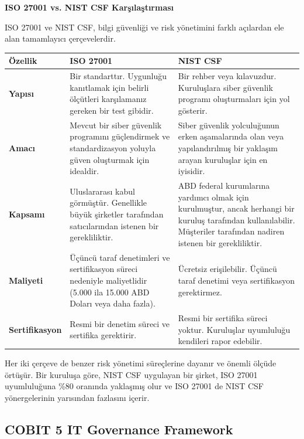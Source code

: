 \textbf{ISO 27001 vs. NIST CSF Karşılaştırması}

ISO 27001 ve NIST CSF, bilgi güvenliği ve risk yönetimini farklı açılardan ele alan tamamlayıcı çerçevelerdir.

\begin{center}
\begin{tabular}{|p{4cm}|p{6cm}|p{4cm}|}
\hline
\hline
\textbf{Özellik} & \textbf{ISO 27001} & \textbf{NIST CSF} \\
\hline
\hline
\textbf{Yapısı} & Bir standarttır. Uygunluğu kanıtlamak için belirli ölçütleri karşılamanız gereken bir test gibidir. & Bir rehber veya kılavuzdur. Kuruluşlara siber güvenlik programı oluşturmaları için yol gösterir. \\
\hline
\hline
\textbf{Amacı} & Mevcut bir siber güvenlik programını güçlendirmek ve standardizasyon yoluyla güven oluşturmak için idealdir. & Siber güvenlik yolculuğunun erken aşamalarında olan veya yapılandırılmış bir yaklaşım arayan kuruluşlar için en iyisidir. \\
\hline
\hline
\textbf{Kapsamı} & Uluslararası kabul görmüştür. Genellikle büyük şirketler tarafından satıcılarından istenen bir gerekliliktir. & ABD federal kurumlarına yardımcı olmak için kurulmuştur, ancak herhangi bir kuruluş tarafından kullanılabilir. Müşteriler tarafından nadiren istenen bir gerekliliktir. \\
\hline
\hline
\textbf{Maliyeti} & Üçüncü taraf denetimleri ve sertifikasyon süreci nedeniyle maliyetlidir (5.000 ila 15.000 ABD Doları veya daha fazla). & Ücretsiz erişilebilir. Üçüncü taraf denetimi veya sertifikasyon gerektirmez. \\
\hline
\hline
\textbf{Sertifikasyon} & Resmi bir denetim süreci ve sertifika gerektirir. & Resmi bir sertifika süreci yoktur. Kuruluşlar uyumluluğu kendileri rapor edebilir. \\
\hline
\hline
\hline
\end{tabular}
\end{center}

Her iki çerçeve de benzer risk yönetimi süreçlerine dayanır ve önemli ölçüde örtüşür. Bir kuruluşa göre, NIST CSF uygulayan bir şirket, ISO 27001 uyumluluğuna \%80 oranında yaklaşmış olur ve ISO 27001 de NIST CSF yönergelerinin yarısından fazlasını içerir.

\subsection{COBIT 5 IT Governance Framework}

